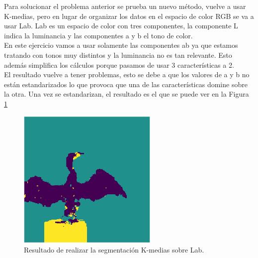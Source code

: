 Para solucionar el problema anterior se prueba un nuevo método, vuelve a usar K-medias, pero en lugar  de organizar los datos en el espacio de color RGB se va a usar Lab. Lab es un espacio de color con tres componentes, la componente L indica la luminancia y las componentes a y b el tono de color.\\

En este ejercicio vamos a usar solamente las componentes ab ya que estamos tratando con tonos muy distintos y la luminancia no es tan relevante. Esto además simplifica los cálculos porque pasamos de usar 3 características a 2.\\

El resultado vuelve a tener problemas, esto se debe a que los valores de a y b no están estandarizados lo que provoca que una de las características domine sobre la otra. Una vez se estandarizan, el resultado es el que se puede ver en la Figura \ref{segmentacionlab}\\


\begin{figure}[h]
\centering
\includegraphics[width=0.6\textwidth]{imagenes/segmentacionlab}
\caption{Resultado de realizar la segmentación K-medias sobre Lab.}
\label{segmentacionlab}
\end{figure}

